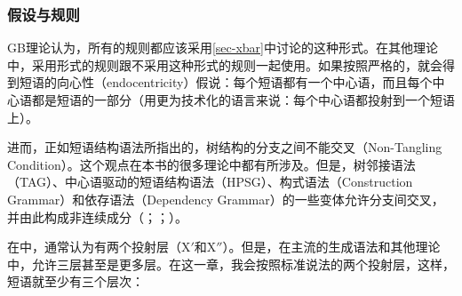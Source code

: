\subsubsection{假设与规则}

GB理论认为，所有的规则都应该采用\ref{sec-xbar}中讨论的\xbarc 这种形式。在其他理论中，采用\xbarc 形式的规则跟不采用这种形式的规则一起使用。如果按照严格的\xbartc，就会得到短语的向心性（endocentricity）假说：每个短语都有一个中心语，而且每个中心语都是短语的一部分（用更为技术化的语言来说：每个中心语都投射到一个短语上）。

进而，正如短语结构语法所指出的，树结构的分支之间不能交叉（Non-Tangling Condition）。这个观点在本书的很多理论中都有所涉及。但是，树邻接语法\indextagc（TAG）、中心语驱动的短语结构语法\indexhpsgc（HPSG）、构式语法\indexcxgc（Construction Grammar）和依存语法\indexdgc （Dependency Grammar）的一些变体允许分支间交叉，并由此构成非连续成分（\citealp*{BJR91a,Reape94a,BC2005a}；\citealp[]{Heringer96a-u}；\citealp[\S~9.6.2]{Eroms2000a}）。

在\xbartc 中，通常认为有两个投射层（X$'$和X$''$）。但是，在主流的生成语法和其他理论中，允许三层甚至是更多层\citep{Jackendoff77a,Uszkoreit87a}。在这一章，我会按照标准说法的两个投射层，这样，短语就至少有三个层次：

